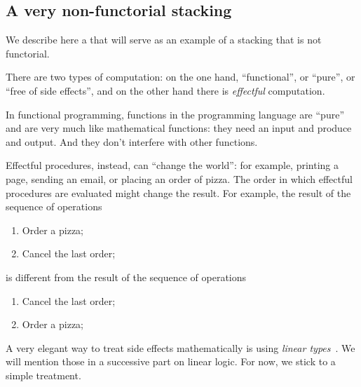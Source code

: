\subsection{A very non-functorial stacking}

We describe here a  that will serve as an example of a stacking  that is not functorial.

There are two types of computation: on the one hand, ``functional'', or ``pure'', or ``free of side effects'', and on the other hand there is \emph{effectful} computation.

In functional programming, functions in the programming language are ``pure'' and are very much like mathematical functions: they need an input and produce and output.
And they don't interfere with other functions.

Effectful procedures, instead, can ``change the world'': for example, printing a page, sending an email, or placing an order of pizza.
The order in which effectful procedures are evaluated might change the result.
For example, the result of the sequence of operations
%
\begin{enumerate}
    \item Order a pizza;
    \item Cancel the last order;
\end{enumerate}
%
is different from the result of the sequence of operations
%
\begin{enumerate}
    \item Cancel the last order;
    \item Order a pizza;
\end{enumerate}

A very elegant way to treat side effects mathematically is using \emph{linear types}~\cite{Wadler90lineartypes}.
We will mention those in a successive part on linear logic.
For now, we stick to a simple treatment.

\begin{marginfigure}
    \centering
    \\
    \caption{}
    \label{fig:effects12}
\end{marginfigure}

